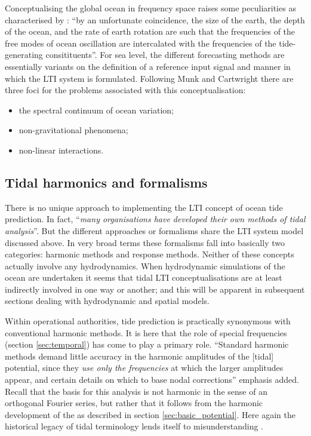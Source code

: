 Conceptualising the global ocean in frequency space raises some peculiarities as characterised by  \citet{Groves:1975ky}: ``by an unfortunate coincidence, the size of the earth, the depth of the ocean, and the rate of earth rotation are such that the frequencies of the free modes of ocean oscillation are intercalated with the frequencies of the tide-generating consitituents''.
For sea level, the different forecasting methods are essentially variants on the  definition of a reference input signal and manner in which the LTI system is formulated.   Following Munk and Cartwright \citep{Munk:1966ts} there are three foci for the problems associated with this conceptualisation:
\begin{itemize}
\item the spectral continuum of ocean variation;
\item non-gravitational phenomena; 
\item non-linear interactions.   
\end{itemize}

\subsection{Tidal harmonics and formalisms}
\label{sec:formalisms}
There is no unique approach to implementing the LTI concept of ocean tide prediction. In fact, ``\textit{many organisations have developed their own methods of tidal analysis}''\citep{IOC:2005tj}. But the different approaches or formalisms share the LTI system model discussed above.  
In very broad terms these formalisms fall into basically two categories: harmonic methods and response methods.  
Neither of these concepts actually involve any hydrodynamics. When hydrodynamic simulations of the ocean are undertaken it seems that tidal LTI conceptualisations are at least indirectly involved in one way or another; and this will be apparent in subsequent sections dealing with hydrodynamic and spatial models. 

Within operational authorities, tide prediction is practically synonymous with conventional harmonic methods. It is here that the role of special frequencies (section \ref{sec:temporal}) has come to play a primary role.
``Standard harmonic methods demand little accuracy in the harmonic amplitudes of the [tidal] potential, since they \textit{use only the frequencies} at which the larger amplitudes appear, and certain details on which to base nodal corrections''\citep{Cartwright:1973em} emphasis added.
Recall that the basis for this analysis is not harmonic in the sense of an orthogonal Fourier series, but rather that it follows from the harmonic development of the \ATGP{} as described in section \ref{sec:basic_potential}.    Here again the historical legacy of tidal terminology lends itself to misunderstanding \citep{Cartwright:2000tt}\citep{Parker:2007wq}.


